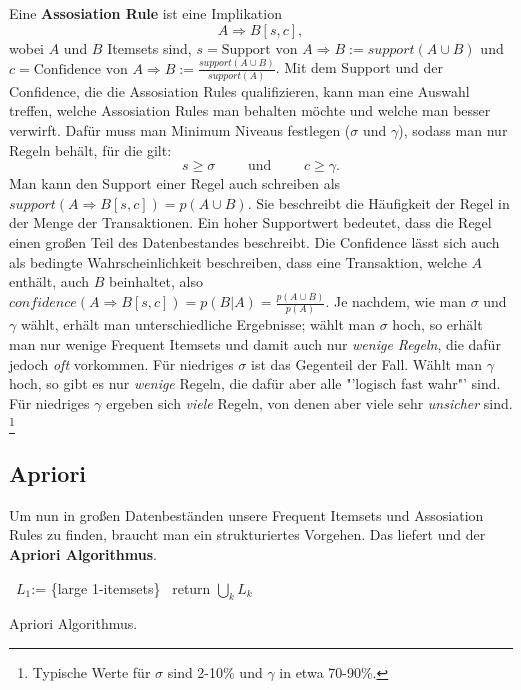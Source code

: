 Eine \textbf{Assosiation Rule} ist eine Implikation \[A\Rightarrow B[s,c],\] wobei
\(A\) und \(B\) Itemsets sind, \(s = \text{Support von } A \Rightarrow B 
:= support(A\cup B)\) und 
\(c = \text{Confidence von } A \Rightarrow B := \frac{support(A\cup B)}{support(A)}\).
Mit dem Support und der Confidence, die die Assosiation Rules qualifizieren, kann 
man eine Auswahl treffen, welche Assosiation Rules man behalten möchte und welche
man besser verwirft. Dafür muss man Minimum Niveaus festlegen (\(\sigma\) und \(\gamma\)),
sodass man nur Regeln behält, für die gilt:
\[
	s \geq \sigma \qquad \text{ und } \qquad c \geq \gamma.
\]
Man kann den Support einer Regel auch schreiben als \(support(A\Rightarrow B [s,c])
= p(A\cup B)\). Sie beschreibt die Häufigkeit der Regel in der Menge der
Transaktionen. Ein hoher Supportwert bedeutet, dass die Regel einen großen Teil
des Datenbestandes beschreibt. Die Confidence lässt sich auch als bedingte
Wahrscheinlichkeit beschreiben, dass eine Transaktion, welche \(A\) enthält, auch \(B\)
beinhaltet, also \(confidence(A\Rightarrow B[s,c]) = p(B|A) = \frac{p(A\cup B)}
{p(A)}\). Je nachdem, wie man \(\sigma\) und \(\gamma\) wählt, erhält man
unterschiedliche Ergebnisse; wählt man \(\sigma\) hoch, so erhält man nur wenige
Frequent Itemsets und damit auch nur \textit{wenige Regeln}, die dafür jedoch
\textit{oft} vorkommen. Für niedriges \(\sigma\) ist das Gegenteil der Fall.
Wählt man \(\gamma\) hoch, so gibt es nur \textit{wenige} Regeln, die dafür
aber alle "'logisch fast wahr"' sind. Für niedriges \(\gamma\) ergeben sich 
\textit{viele} Regeln, von denen aber viele sehr \textit{unsicher} sind.
\footnote{Typische Werte für \(\sigma\) sind 2-10\% und \(\gamma\) in etwa 70-90\%.}


\subsection{Apriori}
Um nun in großen Datenbeständen unsere Frequent Itemsets und Assosiation Rules
zu finden, braucht man ein strukturiertes Vorgehen. Das liefert und der
\textbf{Apriori Algorithmus}.

\begin{algorithm}[tbh]
	\SetAlgoLined
	\DontPrintSemicolon
	\BlankLine
	\ {\(L_1\):= \{large 1-itemsets\}}\;
	\ {return \(\bigcup_k L_k\)}\;
	\caption{Apriori Algorithmus.}
	\label{alg:apriori}
\end{algorithm}

